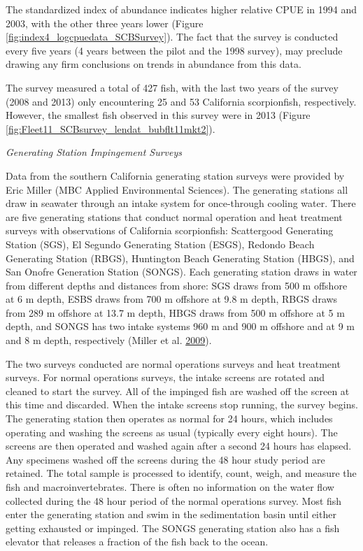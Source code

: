 \documentclass[12pt,]{article}
\begin{document}
The standardized index of abundance indicates higher relative CPUE in
1994 and 2003, with the other three years lower (Figure
\ref{fig:index4_logcpuedata_SCBSurvey}). The fact that the survey is
conducted every five years (4 years between the pilot and the 1998
survey), may preclude drawing any firm conclusions on trends in
abundance from this data.

The survey measured a total of 427 fish, with the last two years of the
survey (2008 and 2013) only encountering 25 and 53 California
scorpionfish, respectively. However, the smallest fish observed in this
survey were in 2013 (Figure
\ref{fig:Fleet11_SCBsurvey_lendat_bubflt11mkt2}).

\emph{Generating Station Impingement Surveys}

Data from the southern California generating station surveys were
provided by Eric Miller (MBC Applied Environmental Sciences). The
generating stations all draw in seawater through an intake system for
once-through cooling water. There are five generating stations that
conduct normal operation and heat treatment surveys with observations of
California scorpionfish: Scattergood Generating Station (SGS), El
Segundo Generating Station (ESGS), Redondo Beach Generating Station
(RBGS), Huntington Beach Generating Station (HBGS), and San Onofre
Generation Station (SONGS). Each generating station draws in water from
different depths and distances from shore: SGS draws from 500 m offshore
at 6 m depth, ESBS draws from 700 m offshore at 9.8 m depth, RBGS draws
from 289 m offshore at 13.7 m depth, HBGS draws from 500 m offshore at 5
m depth, and SONGS has two intake systems 960 m and 900 m offshore and
at 9 m and 8 m depth, respectively (Miller et al.
\protect\hyperlink{ref-Miller2009}{2009}).

The two surveys conducted are normal operations surveys and heat
treatment surveys. For normal operations surveys, the intake screens are
rotated and cleaned to start the survey. All of the impinged fish are
washed off the screen at this time and discarded. When the intake
screens stop running, the survey begins. The generating station then
operates as normal for 24 hours, which includes operating and washing
the screens as usual (typically every eight hours). The screens are then
operated and washed again after a second 24 hours has elapsed. Any
specimens washed off the screens during the 48 hour study period are
retained. The total sample is processed to identify, count, weigh, and
measure the fish and macroinvertebrates. There is often no information
on the water flow collected during the 48 hour period of the normal
operations survey. Most fish enter the generating station and swim in
the sedimentation basin until either getting exhausted or impinged. The
SONGS generating station also has a fish elevator that releases a
fraction of the fish back to the ocean.
\end{document}
